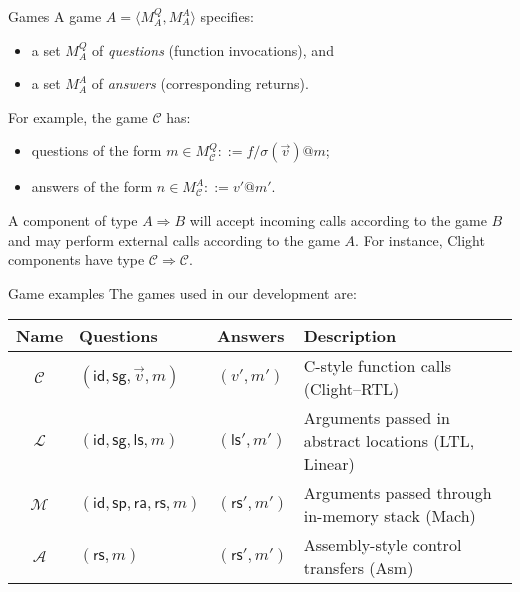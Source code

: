 \documentclass{beamer}
\newcommand{\kw}[1]{\ensuremath{ \mathsf{#1} }}
\begin{document}
\begin{frame}{Games} %
A game $A = \langle M_A^Q, M_A^A \rangle$ specifies:
\begin{itemize}
\item a set $M_A^Q$ of \emph{questions} (function invocations), and
\item a set $M_A^A$ of \emph{answers} (corresponding returns).
\end{itemize}

\vfill
For example, the game $\mathcal{C}$ has:
\begin{itemize}
\item questions of the form $m \in M_\mathcal{C}^Q ::= f/\sigma(\vec{v})@m$;
\item answers of the form $n \in M_\mathcal{C}^A ::= v'@m'$.
\end{itemize}

\vfill
A component of type $A \Rightarrow B$
will accept incoming calls according to the game $B$ and
may perform external calls according to the game $A$.
For instance,
Clight components have type
$\mathcal{C} \Rightarrow \mathcal{C}$.
\end{frame}

\begin{frame}{Game examples} %
The games used in our development are:
\begin{center}
  \footnotesize
  \begin{tabular}{cllp{}}
    \hline
    Name & Questions & Answers & Description \\
    \hline
    $\mathcal{C}$ & $(\kw{id}, \kw{sg}, \vec{v}, m)$ & $(v', m')$ &
      C-style function calls (Clight--RTL) \\
    $\mathcal{L}$ & $(\kw{id}, \kw{sg}, \kw{ls}, m)$ & $(\kw{ls}', m')$ &
      Arguments passed in abstract locations (LTL, Linear) \\
    $\mathcal{M}$ & $(\kw{id}, \kw{sp},\kw{ra},\kw{rs}, m)$ & $(\kw{rs}', m')$ &
      Arguments passed through in-memory stack (Mach) \\
    $\mathcal{A}$ & $(\kw{rs}, m)$ & $(\kw{rs}', m')$ &
      Assembly-style control transfers (Asm) \\
    \hline
  \end{tabular}
\end{center}
\end{frame}
\end{document}
